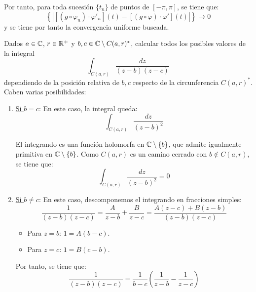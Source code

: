 \begin{ejercicio}
    Por tanto, para toda sucesión $\{t_n\}$ de puntos de $[-\pi,\pi]$, se tiene que:
    \begin{equation*}
        \left\{\left|[(g\circ \varphi_n)\cdot \varphi'_n](t) - [(g\circ \varphi)\cdot \varphi'](t)\right|\right\}\to 0
    \end{equation*}
    y se tiene por tanto la convergencia uniforme buscada.
\end{ejercicio}

\begin{ejercicio}
    Dados $a \in \mathbb{C}$, $r \in \mathbb{R}^+$ y $b,c \in \mathbb{C}\setminus C(a,r)^\ast$, calcular todos los posibles valores de la integral
    \[
        \int_{C(a,r)} \frac{dz}{(z-b)(z-c)}
    \]
    dependiendo de la posición relativa de $b,c$ respecto de la circunferencia $C(a,r)^\ast$.\\

    Caben varias posibilidades:
    \begin{enumerate}
        \item \ul{Si $b=c$}: En este caso, la integral queda:
        \begin{equation*}
            \int_{C(a,r)} \frac{dz}{(z-b)^2}
        \end{equation*}

        El integrando es una función holomorfa en $\mathbb{C}\setminus \{b\}$, que admite igualmente primitiva en $\mathbb{C}\setminus \{b\}$. Como $C(a,r)$ es un camino cerrado con $b\notin C(a,r)$, se tiene que:
        \begin{equation*}
            \int_{C(a,r)} \frac{dz}{(z-b)^2} = 0
        \end{equation*}

        \item{\ul{Si $b\neq c$}}: En este caso, descomponemos el integrando en fracciones simples:
        \begin{equation*}
            \dfrac{1}{(z-b)(z-c)} = \dfrac{A}{z-b} + \dfrac{B}{z-c} = \dfrac{A(z-c)+B(z-b)}{(z-b)(z-c)}
        \end{equation*}
        \begin{itemize}
            \item Para $z=b$: $1=A(b-c)$.
            \item Para $z=c$: $1=B(c-b)$.
        \end{itemize}

        Por tanto, se tiene que:
        \begin{equation*}
            \frac{1}{(z-b)(z-c)} = \frac{1}{b-c}\left(\frac{1}{z-b}-\frac{1}{z-c}\right)
        \end{equation*}


\end{enumerate}
\end{ejercicio}
